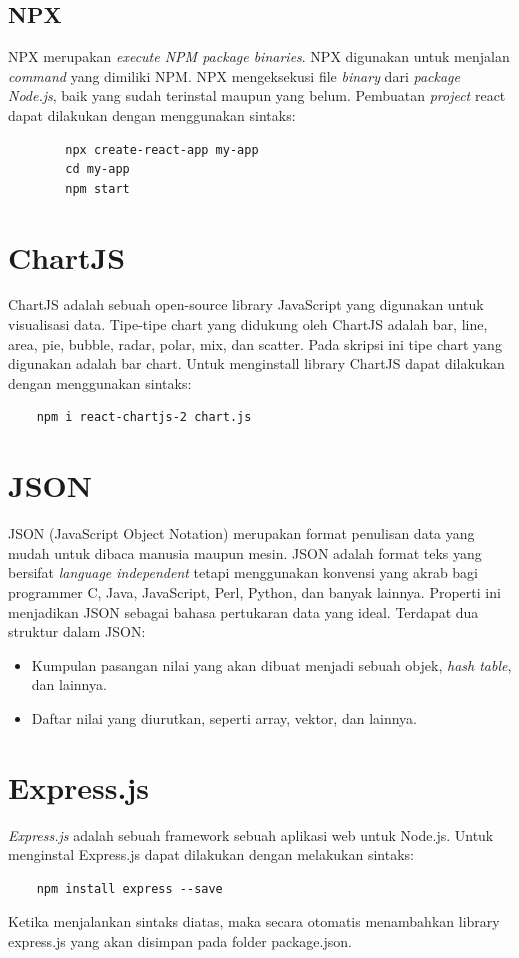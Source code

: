 \subsection{NPX}
NPX merupakan \textit{execute NPM package binaries}. NPX digunakan untuk menjalan \textit{command} yang dimiliki NPM. NPX mengeksekusi file \textit{binary} dari \textit{package} \textit{Node.js}, baik yang sudah terinstal maupun yang belum. Pembuatan \textit{project} react dapat dilakukan dengan menggunakan sintaks:
    \begin{verbatim}
        npx create-react-app my-app
        cd my-app
        npm start
    \end{verbatim}

\section{ChartJS}
ChartJS adalah sebuah open-source library JavaScript yang digunakan untuk visualisasi data. Tipe-tipe chart yang didukung oleh ChartJS adalah bar, line, area, pie, bubble, radar, polar, mix, dan scatter. Pada skripsi ini tipe chart yang digunakan adalah bar chart. Untuk menginstall library ChartJS dapat dilakukan dengan menggunakan sintaks:
\begin{verbatim}
	npm i react-chartjs-2 chart.js
\end{verbatim}

\section{JSON}
JSON (JavaScript Object Notation) merupakan format penulisan data yang mudah untuk dibaca manusia maupun mesin. JSON adalah format teks yang bersifat \textit{language independent} tetapi menggunakan konvensi yang akrab bagi programmer C, Java, JavaScript, Perl, Python, dan banyak lainnya. Properti ini menjadikan JSON sebagai bahasa pertukaran data yang ideal. Terdapat dua struktur dalam JSON:
\begin{itemize}
    \item Kumpulan pasangan nilai yang akan dibuat menjadi sebuah objek, \textit{hash table}, dan lainnya.
    \item Daftar nilai yang diurutkan, seperti array, vektor, dan lainnya.
\end{itemize}

\section{Express.js}
\textit{Express.js} adalah sebuah framework sebuah aplikasi web untuk Node.js. Untuk menginstal Express.js dapat dilakukan dengan melakukan sintaks:
\begin{verbatim}
	npm install express --save
\end{verbatim}
Ketika menjalankan sintaks diatas, maka secara otomatis menambahkan library express.js yang akan disimpan pada folder package.json.
